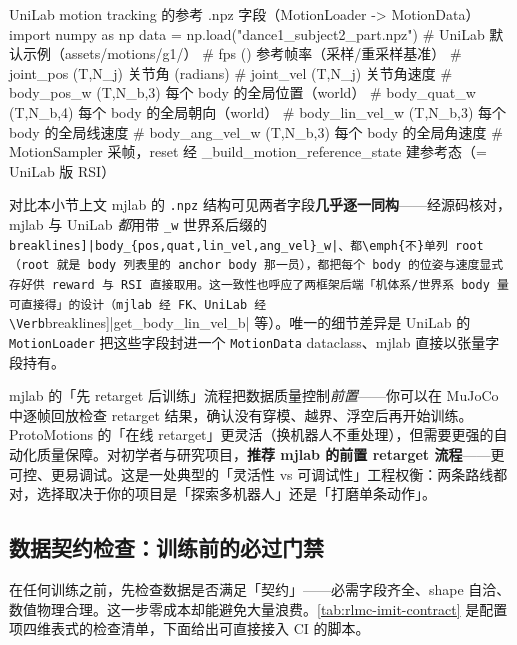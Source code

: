 \begin{codebox}[Python]{UniLab motion tracking 的参考 .npz 字段（MotionLoader -> MotionData）}
import numpy as np
data = np.load("dance1_subject2_part.npz")   # UniLab 默认示例（assets/motions/g1/）
# fps            ()         参考帧率（采样/重采样基准）
# joint_pos      (T,N_j)    关节角 (radians)
# joint_vel      (T,N_j)    关节角速度
# body_pos_w     (T,N_b,3)  每个 body 的全局位置（world）
# body_quat_w    (T,N_b,4)  每个 body 的全局朝向（world）
# body_lin_vel_w (T,N_b,3)  每个 body 的全局线速度
# body_ang_vel_w (T,N_b,3)  每个 body 的全局角速度
# MotionSampler 采帧，reset 经 _build_motion_reference_state 建参考态（= UniLab 版 RSI）
\end{codebox}

对比本小节上文 mjlab 的 \texttt{.npz} 结构可见两者字段\textbf{几乎逐一同构}——经源码核对，mjlab 与 UniLab \emph{都}用带 \verb|_w| 世界系后缀的 \Verb[breaklines]|body_{pos,quat,lin_vel,ang_vel}_w|、都\emph{不}单列 root（root 就是 body 列表里的 anchor body 那一员），都把每个 body 的位姿与速度显式存好供 reward 与 RSI 直接取用。这一致性也呼应了两框架后端「机体系/世界系 body 量可直接得」的设计（mjlab 经 FK、UniLab 经 \Verb[breaklines]|get_body_lin_vel_b| 等）。唯一的细节差异是 UniLab 的 \verb|MotionLoader| 把这些字段封进一个 \verb|MotionData| dataclass、mjlab 直接以张量字段持有。

\begin{insight}\label{ins:rlmc-imit-pretarget}
mjlab 的「先 retarget 后训练」流程把数据质量控制\emph{前置}——你可以在 MuJoCo 中逐帧回放检查 retarget 结果，确认没有穿模、越界、浮空后再开始训练。ProtoMotions 的「在线 retarget」更灵活（换机器人不重处理），但需要更强的自动化质量保障。对初学者与研究项目，\textbf{推荐 mjlab 的前置 retarget 流程}——更可控、更易调试。这是一处典型的「灵活性 vs 可调试性」工程权衡：两条路线都对，选择取决于你的项目是「探索多机器人」还是「打磨单条动作」。
\end{insight}

\subsection{数据契约检查：训练前的必过门禁}
\label{sec:rlmc-imit-data-contract}

在任何训练之前，先检查数据是否满足「契约」——必需字段齐全、shape 自洽、数值物理合理。这一步零成本却能避免大量浪费。\cref{tab:rlmc-imit-contract} 是配置项四维表式的检查清单，下面给出可直接接入 CI 的脚本。

